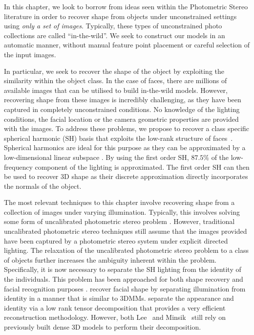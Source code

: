 In this chapter, we look to borrow from ideas seen within the Photometric Stereo
literature in order to recover shape from objects under unconstrained settings
using \textit{only a set of images}. Typically, these types of unconstrained
photo collections are called ``in-the-wild''. We seek to construct our models in
an automatic manner, without manual feature point placement or careful selection
of the input images.

In particular, we seek to recover the shape of the object by exploiting the
similarity within the object class. In the case of faces, there are millions of
available images that can be utilised to build in-the-wild models. However,
recovering shape from these images is incredibly challenging, as they have been
captured in completely unconstrained conditions. No knowledge of the lighting
conditions, the facial location or the camera geometric properties are provided
with the images. To address these problems, we propose to recover a class
specific spherical harmonic (SH) basis that exploits the low-rank structure of
faces~\cite{georghiades2001fromfew,Basri:2003ie}. Spherical harmonics are ideal for
this purpose as they can be approximated by a low-dimensional linear subspace
\cite{Basri:2003ie,ramamoorthi2001relationship}.
By using the first order SH, $87.5\%$ of
the low-frequency component of the lighting is approximated. The first order SH
can then be used to recover 3D shape as their discrete approximation directly
incorporates the normals of the object.

The most relevant techniques to this chapter involve recovering shape from a
collection of images under varying illumination. Typically, this involves
solving some form of uncalibrated photometric stereo problem
\cite{basri2007photometric,papadhimitri2014closed,papadhimitri2014closed}. However, traditional uncalibrated
photometric stereo techniques still assume that the images provided have been
captured by a photometric stereo system under explicit directed lighting.
The relaxation of the uncalibrated photometric stereo problem to a class of
objects further increases the ambiguity inherent within the problem.
Specifically, it is now necessary to separate the SH lighting from the identity
of the individuals. This problem has been approached for both shape recovery and
facial recognition purposes
\cite{lee2005bilinear,lee2005estimation,minsik2014realtime,minsik2013robust,zhou2007appearance}. 
\citet{lee2005bilinear,lee2005estimation} recover facial shape by separating illumination
from identity in a manner that is similar to 3DMMs. 
\citet{lee2005bilinear,lee2005estimation} separate
\citet{minsik2014realtime,minsik2013robust} the appearance and identity via a low rank
tensor decomposition that provides a very efficient reconstruction methodology.
However, both Lee \etal~and Minsik \etal~still rely on previously built dense 3D
models to perform their decomposition.

